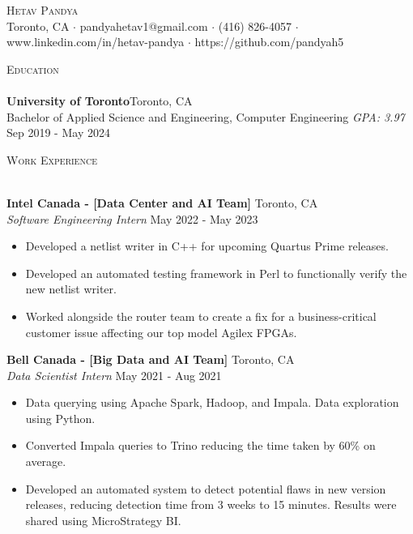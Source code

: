 \documentclass[a4paper]{article}
\newcommand{\lineunder} {
    \vspace*{-8pt} \\
    \hspace*{-18pt} \hrulefill \\
}
\newcommand{\header} [1] {
    {\hspace*{-18pt}\vspace*{6pt} \textsc{#1}}
    \vspace*{-6pt} \lineunder
}
\begin{document}
\vspace*{-40pt}



\vspace*{-10pt}
\begin{center}
	{\Huge \scshape {Hetav Pandya}}\\
	Toronto, CA $\cdot$ pandyahetav1@gmail.com $\cdot$ (416) 826-4057 $\cdot$ www.linkedin.com/in/hetav-pandya $\cdot$ https://github.com/pandyah5\\
\end{center}

\header{Education}
\textbf{University of Toronto}\hfill Toronto, CA\\
Bachelor of Applied Science and Engineering, Computer Engineering \textit{GPA: 3.97} \hfill Sep 2019 - May 2024\\
\vspace{2mm}

\header{Work Experience}
\vspace{1mm}

\textbf{Intel Canada - [Data Center and AI Team]} \hfill Toronto, CA\\
\textit{Software Engineering Intern} \hfill May 2022 - May 2023\\
\vspace{-1mm}
\begin{itemize} \itemsep 1pt
	\item Developed a netlist writer in C++ for upcoming Quartus Prime releases.
	\item Developed an automated testing framework in Perl to functionally verify the new netlist writer.
	\item Worked alongside the router team to create a fix for a business-critical customer issue affecting our top model Agilex FPGAs. 
\end{itemize}

\textbf{Bell Canada - [Big Data and AI Team]} \hfill Toronto, CA\\
\textit{Data Scientist Intern} \hfill May 2021 - Aug 2021\\
\vspace{-1mm}
\begin{itemize} \itemsep 1pt
	\item Data querying using Apache Spark, Hadoop, and Impala. Data exploration using Python.
	\item Converted Impala queries to Trino reducing the time taken by 60\% on average.
	\item Developed an automated system to detect potential flaws in new version releases, reducing detection time from 3 weeks to 15 minutes. Results were shared using MicroStrategy BI.
\end{itemize}
\end{document}
